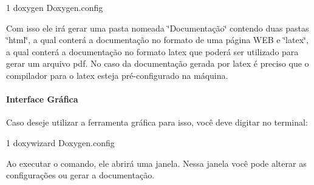 \begin{DoxyCode}
1 doxygen Doxygen.config 
\end{DoxyCode}


Com isso ele irá gerar uma pasta nomeada \char`\"{}\+Documentação\char`\"{} contendo duas pastas \char`\"{}html\char`\"{}, a qual conterá a documentação no formato de uma página W\+EB e \char`\"{}latex\char`\"{}, a qual conterá a documentação no formato latex que poderá ser utilizado para gerar um arquivo pdf. No caso da documentação gerada por latex é preciso que o compilador para o latex esteja pré-\/configurado na máquina.

\paragraph*{Interface Gráfica}

Caso deseje utilizar a ferramenta gráfica para isso, você deve digitar no terminal\+:


\begin{DoxyCode}
1 doxywizard Doxygen.config
\end{DoxyCode}


Ao executar o comando, ele abrirá uma janela. Nessa janela você pode alterar as configurações ou gerar a documentação. 